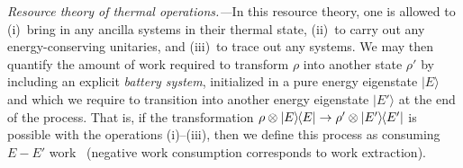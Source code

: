\documentclass[prl,reprint,longbibliography,superscriptaddress]{revtex4-1}
\renewcommand\paragraph[1]{\par\emph{#1.---}\kern2pt\relax\ignorespaces}
\begin{document}
\paragraph{Resource theory of thermal operations}In this resource theory, one is allowed to (i)~bring in any ancilla systems in
their thermal state, (ii)~to carry out any energy-conserving unitaries, and
(iii)~to trace out any systems.
We may then quantify the amount of work required to transform $\rho$ into
another state $\rho'$ by including an explicit \emph{battery system},
initialized in a pure energy eigenstate $\lvert {E}\rangle $ and which we require to
transition into another energy eigenstate $\lvert {E'}\rangle $ at the end of the process.
That is, if the transformation $\rho\otimes\lvert {E}\rangle\hspace*{-0.25ex}\langle{E}\rvert  \to \rho'\otimes\lvert {E'}\rangle\hspace*{-0.25ex}\langle{E'}\rvert $
is possible with the operations (i)--(iii), then we define this process as
consuming $E-E'$ work~\cite{Horodecki2013_ThermoMaj,Skrzypczyk2014NComm_individual,Faist2018PRX_workcost} (negative work
consumption corresponds to work extraction).
\end{document}
